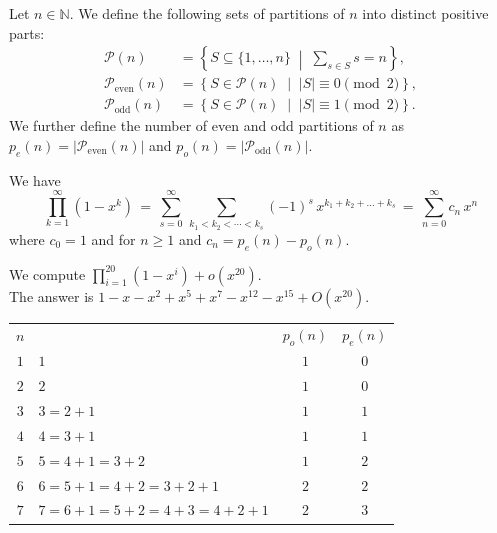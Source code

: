 \begin{definition} 

Let $n \in \mathbb{N}$. We define the following sets of partitions of $n$ into distinct positive parts:
\begin{align*}
\mathcal{P}(n) &= \left\{ S \subseteq \{1, \ldots, n\} \;\middle|\; \sum_{s \in S} s = n \right\}, \\
\mathcal{P}_{\mathrm{even}}(n) &= \left\{ S \in \mathcal{P}(n) \;\middle|\; |S| \equiv 0 \pmod{2} \right\}, \\
\mathcal{P}_{\mathrm{odd}}(n) &= \left\{ S \in \mathcal{P}(n) \;\middle|\; |S| \equiv 1 \pmod{2} \right\}.
\end{align*}
We further define the number of even and odd partitions of $n$ as $p_e(n) = |\mathcal{P}_{\mathrm{even}}(n)|$ and $p_o(n) = |\mathcal{P}_{\mathrm{odd}}(n)|$.
\end{definition}


\begin{lemma}
We have
$$\prod_{k=1}^{\infty}(1-x^k)\,=\,\sum_{s=0}^\infty\,\sum_{k_1<k_2<\cdots<k_s}(-1)^s\,x^{k_1+k_2+\ldots+k_s}\,=\,\sum_{n=0}^\infty c_n\, x^n$$
where $c_0=1$ and for $n\geq 1$ and $c_n=p_e(n)-p_o(n).$
\end{lemma}

\begin{example}
We compute $\prod_{i=1}^{20}(1 - x^i) + o(x^{20}).$\\

The answer is $1-x-x^2+x^5+x^7-x^{12}-x^{15}+O\left(x^{20}\right).$\\

\begin{center}
\begin{tabular}{c|l|c|c}
$n$ && $p_o(n)$ & $p_e(n)$\\
$1$&$1$&$1$&$0$\\
$2$&$2$&$1$&$0$\\
$3$&$3=2+1$&$1$&$1$\\
$4$&$4=3+1$&$1$&$1$\\
$5$&$5=4+1=3+2$&$1$&$2$\\
$6$&$6=5+1=4+2=3+2+1$&$2$&$2$\\
$7$&$7=6+1=5+2=4+3=4+2+1$&$2$&$3$\\
\end{tabular}
\end{center}

\end{example}


